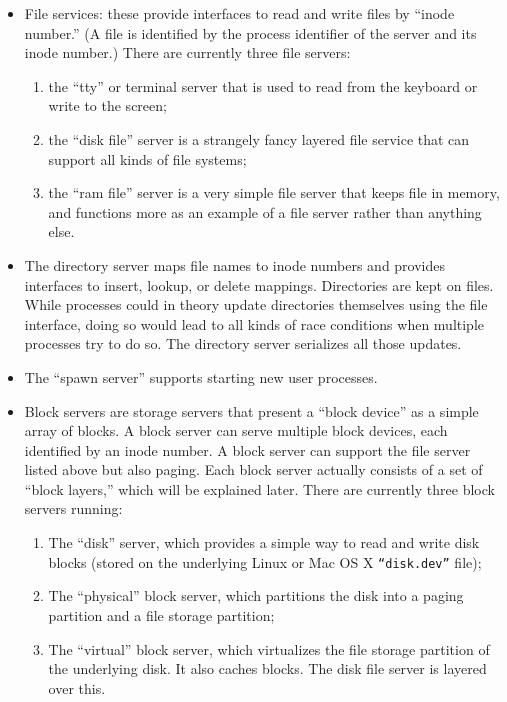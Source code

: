\documentclass{article}
\begin{document}
\begin{itemize}

\item File services: these provide interfaces to read and write files
by ``inode number.''  (A file is identified by the process identifier
of the server and its inode number.)  There are currently three file
servers:
\begin{enumerate}
\item the ``tty'' or terminal server that is used to read from the
keyboard or write to the screen;
\item the ``disk file'' server is a strangely fancy layered file service
that can support all kinds of file systems;
\item the ``ram file'' server is a very simple file server that keeps
file in memory, and functions more as an example of a file server
rather than anything else.
\end{enumerate}

\item The directory server maps
file names to inode numbers and provides interfaces to insert, lookup,
or delete mappings.  Directories are kept on files.  While processes
could in theory update directories themselves using the file interface,
doing so would lead to all kinds of race conditions when multiple
processes try to do so.  The directory server serializes all those
updates.

\item The ``spawn server'' supports starting new user processes.

\item Block servers are storage servers that present a ``block device''
as a simple array of blocks.  A block server can serve multiple block
devices, each identified by an inode number.  A block server can support
the file server listed above but also paging.
Each block server actually consists of a set of ``block layers,'' which
will be explained later.  There are currently
three block servers running:
\begin{enumerate}
\item The ``disk'' server, which provides a simple way to read and write
disk blocks (stored on the underlying Linux or Mac OS X \texttt{``disk.dev''}
file);
\item The ``physical'' block server, which partitions the disk into a
paging partition and a file storage partition;
\item The ``virtual'' block server, which virtualizes the file storage
partition of the underlying disk.  It also caches blocks.  The disk file server
is layered over this.
\end{enumerate}

\end{itemize}
\end{document}
